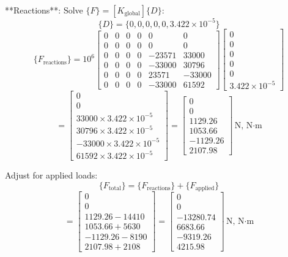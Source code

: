 **Reactions**:
Solve \( \{ F \} = [K_{\text{global}}] \{ D \} \):
\[
\{ D \} = \{ 0, 0, 0, 0, 0, 3.422 \times 10^{-5} \}
\]
\[
\{ F_{\text{reactions}} \} = 10^6 \begin{bmatrix}
0 & 0 & 0 & 0 & 0 & 0 \\
0 & 0 & 0 & 0 & 0 & 0 \\
0 & 0 & 0 & 0 & -23571 & 33000 \\
0 & 0 & 0 & 0 & -33000 & 30796 \\
0 & 0 & 0 & 0 & 23571 & -33000 \\
0 & 0 & 0 & 0 & -33000 & 61592
\end{bmatrix} \begin{bmatrix}
0 \\ 0 \\ 0 \\ 0 \\ 0 \\ 3.422 \times 10^{-5}
\end{bmatrix}
\]
\[
= \begin{bmatrix}
0 \\
0 \\
33000 \times 3.422 \times 10^{-5} \\
30796 \times 3.422 \times 10^{-5} \\
-33000 \times 3.422 \times 10^{-5} \\
61592 \times 3.422 \times 10^{-5}
\end{bmatrix} = \begin{bmatrix}
0 \\
0 \\
1129.26 \\
1053.66 \\
-1129.26 \\
2107.98
\end{bmatrix} \, \text{N, N·m}
\]

Adjust for applied loads:
\[
\{ F_{\text{total}} \} = \{ F_{\text{reactions}} \} + \{ F_{\text{applied}} \}
\]
\[
= \begin{bmatrix}
0 \\
0 \\
1129.26 - 14410 \\
1053.66 + 5630 \\
-1129.26 - 8190 \\
2107.98 + 2108
\end{bmatrix} = \begin{bmatrix}
0 \\
0 \\
-13280.74 \\
6683.66 \\
-9319.26 \\
4215.98
\end{bmatrix} \, \text{N, N·m}
\]

